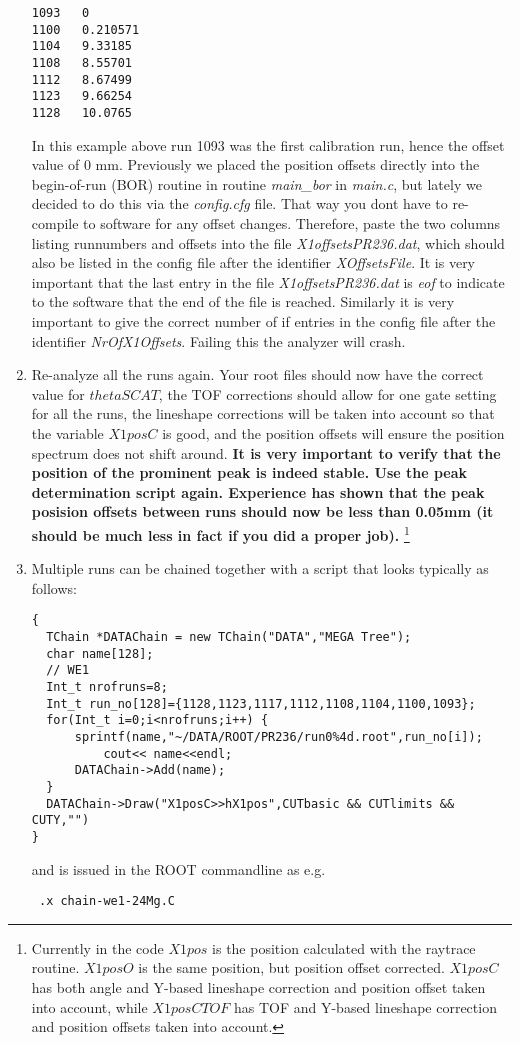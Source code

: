 \documentclass[11pt]{report}
\begin{document}
\begin{enumerate}
\begin{verbatim}
1093   0
1100   0.210571
1104   9.33185
1108   8.55701
1112   8.67499
1123   9.66254
1128   10.0765
\end{verbatim}

In this example above run 1093 was the first calibration run, hence the offset value of 0 mm.
Previously we placed the position offsets directly into the begin-of-run (BOR) routine in routine 
{\it main\_bor} in  {\it main.c}, but lately we decided to do this via the {\it config.cfg} file.
That way you dont have to re-compile to software for any offset changes.
%
Therefore, paste the two columns listing runnumbers and offsets into the file {\it X1offsetsPR236.dat},
which should also be listed in the config file after the identifier {\it XOffsetsFile}. It is very important that
the last entry in the file {\it X1offsetsPR236.dat} is {\it eof} to indicate to the software that the end of the
file is reached. Similarly it is very important to give the correct number of if entries in the config file 
after the identifier
{\it NrOfX1Offsets}. Failing this the analyzer will crash.

\item 
Re-analyze all the runs again.  Your root files should now have the correct
value for $thetaSCAT$, the TOF corrections should allow for one gate setting for all the runs, the lineshape
corrections will be taken into account so that the variable $X1posC$ is good, and the position
offsets will ensure the position spectrum does not shift around.
{\bf It is very important to verify that the position of the prominent peak is indeed stable.
Use the peak determination script again. Experience has shown that the peak posision offsets between runs
should now be less than 0.05mm (it should be much less in fact if you did a proper job).}
 \footnote{Currently in the code $X1pos$ is the position calculated
with the raytrace routine. $X1posO$ is the same position, but position offset corrected. 
$X1posC$ has both angle and Y-based lineshape correction and position offset taken into account, while
$X1posCTOF$ has TOF and Y-based lineshape correction and position offsets taken into account.} 

\item
Multiple runs can be chained together with a script that looks typically as follows:
\begin{verbatim} 
{
  TChain *DATAChain = new TChain("DATA","MEGA Tree");
  char name[128];
  // WE1
  Int_t nrofruns=8; 
  Int_t run_no[128]={1128,1123,1117,1112,1108,1104,1100,1093};
  for(Int_t i=0;i<nrofruns;i++)	{
	  sprintf(name,"~/DATA/ROOT/PR236/run0%4d.root",run_no[i]);
          cout<< name<<endl;
	  DATAChain->Add(name);
  }
  DATAChain->Draw("X1posC>>hX1pos",CUTbasic && CUTlimits && CUTY,"")
} 
\end{verbatim}
and is issued in the ROOT commandline as e.g.
\begin{verbatim} .x chain-we1-24Mg.C \end{verbatim}


\end{enumerate}
\end{document}
